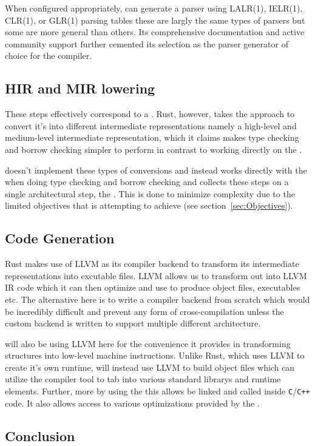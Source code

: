 When configured appropriately, \parserGen{} can generate a \textit{\parserType{}}
parser using LALR(1), IELR(1), CLR(1), or GLR(1) parsing tables these are largly the
same types of parsers but some are more general than others. Its comprehensive
documentation and active community support further cemented its selection as the
parser generator of choice for the \lang{} compiler.

\subsection{HIR and MIR lowering}
\label{sec:hirmir}

These steps effectively correspond to a \static{}. Rust, however, takes the approach
to convert it's \ast{} into different intermediate representations namely a
high-level and medium-level intermediate representation, which it claims makes type
checking and borrow checking simpler to perform in contrast to working directly on
the \ast. 

\lang{} doesn't implement these types of conversions and instead works directly with
the \ast{} when doing type checking and borrow checking and collects these steps on a
single architectural step, the \static. This is done to minimize complexity due to
the limited objectives that \lang{} is attempting to achieve (see
section~\ref{sec:Objectives}).

\subsection{Code Generation}
\label{sec:codeGenTech}

Rust makes use of LLVM as its compiler backend to transform its intermediate
representations into excutable files. LLVM allows us to transform out \ast{} into
LLVM IR code which it can then optimize and use to produce object files, executables
etc. The alternative here is to write a compiler backend from scratch which would be
incredibly difficult and prevent any form of cross-compilation unless the custom
backend is written to support multiple different architecture. 

\lang{} will also be using LLVM here for the convenience it provides in transforming
\ast{} structures into low-level machine instructions. Unlike Rust, which uses LLVM
to create it's own runtime, \lang{} will instead use LLVM to build object files which
can utilize the \gcc{} compiler tool to tab into various standard librarys and
runtime elements. Further, more by using the \gcc{} this allows \lang{} be linked and
called inside \texttt{C}/\texttt{C++} code. It also allows \lang{} access to various
optimizations provided by the \gcc.


\subsection{Conclusion}
\label{sec:techCon}


\newpage

